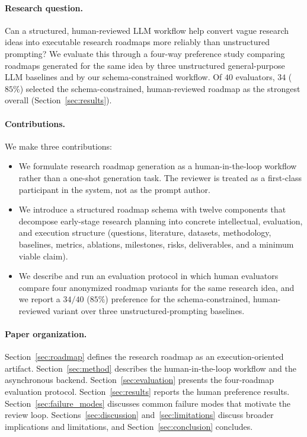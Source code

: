 \documentclass[11pt]{article}
\begin{document}
\paragraph{Research question.} Can a structured, human-reviewed LLM workflow help convert vague research ideas into executable research roadmaps more reliably than unstructured prompting? We evaluate this through a four-way preference study comparing roadmaps generated for the same idea by three unstructured general-purpose LLM baselines and by our schema-constrained workflow. Of $40$ evaluators, $34$ ($85\%$) selected the schema-constrained, human-reviewed roadmap as the strongest overall (Section~\ref{sec:results}).

\paragraph{Contributions.} We make three contributions:
\begin{itemize}
    \item We formulate research roadmap generation as a human-in-the-loop workflow rather than a one-shot generation task. The reviewer is treated as a first-class participant in the system, not as the prompt author.
    \item We introduce a structured roadmap schema with twelve components that decompose early-stage research planning into concrete intellectual, evaluation, and execution structure (questions, literature, datasets, methodology, baselines, metrics, ablations, milestones, risks, deliverables, and a minimum viable claim).
    \item We describe and run an evaluation protocol in which human evaluators compare four anonymized roadmap variants for the same research idea, and we report a $34/40$ ($85\%$) preference for the schema-constrained, human-reviewed variant over three unstructured-prompting baselines.
\end{itemize}

\paragraph{Paper organization.} Section~\ref{sec:roadmap} defines the research roadmap as an execution-oriented artifact. Section~\ref{sec:method} describes the human-in-the-loop workflow and the asynchronous backend. Section~\ref{sec:evaluation} presents the four-roadmap evaluation protocol. Section~\ref{sec:results} reports the human preference results. Section~\ref{sec:failure_modes} discusses common failure modes that motivate the review loop. Sections~\ref{sec:discussion} and~\ref{sec:limitations} discuss broader implications and limitations, and Section~\ref{sec:conclusion} concludes.
\end{document}
